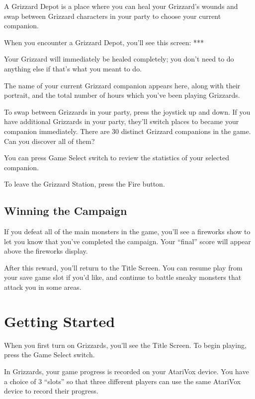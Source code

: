 \documentclass[12pt,twoside,openright,book]{memoir}
\begin{document}
A Grizzard  Depot is a place  where you can heal  your Grizzard's wounds
and  swap between  Grizzard  characters  in your  party  to choose  your
current companion.

When you encounter a Grizzard Depot, you'll see this screen: ***

Your Grizzard will  immediately be healed completely; you  don't need to
do anything else if that's what you meant to do.

The name  of your  current Grizzard companion  appears here,  along with
their  portrait,  and  the  total  number of  hours  which  you've  been
playing Grizzards.

To swap between Grizzards in your party, press the joystick up and down.
If you have additional Grizzards in your party, they'll switch places to
became  your  companion  immediately.  There are  30  distinct  Grizzard
companions in the game. Can you discover all of them?

You  can press  Game  Select switch  to review  the  statistics of  your
selected companion.

To leave the Grizzard Station, press the Fire button.


\section{Winning the Campaign}\label{Winning the Campaign}

If  you  defeat  all of  the  main  monsters  in  the game,  you'll  see
a fireworks  show to let  you know  that you've completed  the campaign.
Your ``final'' score will appear above the fireworks display.

After this  reward, you'll return  to the  Title Screen. You  can resume
play from  your save  game slot  if you'd like,  and continue  to battle
sneaky monsters that attack you in some areas.



\chapter{Getting Started}\label{Getting Started}

When you first turn on Grizzards,  you'll see the Title Screen. To begin
playing, press the Game Select switch.

In Grizzards,  your game progress  is recorded on your  AtariVox device.
You have a choice of 3 ``slots'' so that three different players can use
the same AtariVox device to record their progress.
\end{document}
